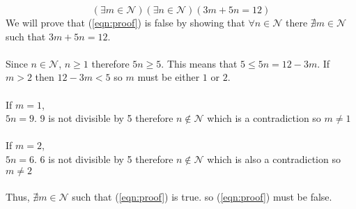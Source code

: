 \documentclass[a4paper]{article}
\begin{document}
\begin{equation}
  (\exists m \in \mathcal{N})(\exists n \in \mathcal{N})(3m + 5n = 12)
  \label{eqn:proof}
\end{equation}
We will prove that (\ref{eqn:proof}) is false by showing that $\forall n \in \mathcal{N}$ there
$\nexists m \in \mathcal{N}$ such that $3m + 5n = 12$. \\\\
Since $n \in \mathcal{N}$, $n\geq1$ therefore $5n\geq5$. This means that $5 \leq 5n = 12 - 3m$. If $m >
2$ then $12 - 3m < 5$ so $m$ must be either $1$ or $2$. \\\\
If $m = 1$, \\
$5n = 9$. 9 is not divisible by 5 therefore $n \not\in \mathcal{N}$ which is a contradiction so $m
\neq 1$ \\\\
If $m = 2$, \\
$5n = 6$. 6 is not divisible by 5 therefore $n \not\in \mathcal{N}$ which is also a contradiction so
$m \neq
2$ \\\\
Thus, $\nexists m \in \mathcal{N}$ such that (\ref{eqn:proof}) is true. so (\ref{eqn:proof}) must be
false.
\end{document}
